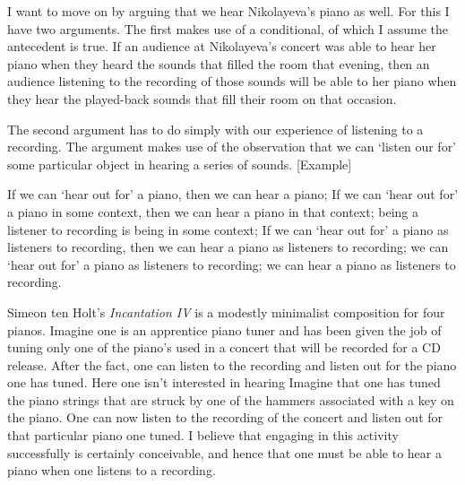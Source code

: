 \documentclass[sloppy, journal, git, bytitle, dodraft]{humapap}
\begin{document}
\sect I want to move on by arguing that we hear Nikolayeva's piano as well. For this I have two arguments. The first makes use of a conditional, of which I assume the antecedent is true. If an audience at Nikolayeva's concert was able to hear her piano when they heard the sounds that filled the room that evening, then an audience listening to the recording of those sounds will be able to her piano when they hear the played-back sounds that fill their room on that occasion. %



The second argument has to do simply with our experience of listening to a recording. The argument makes use of the observation that we can `listen our for' some particular object in hearing a series of sounds. [Example]

If we can `hear out for' a piano, then we can hear a piano; If we can `hear out for' a piano in some context, then we can hear a piano in that context; being a listener to recording is being in some context; If we can `hear out for' a piano as listeners to recording, then we can hear a piano as listeners to recording; we can `hear out for' a piano as listeners to recording; we can hear a piano as listeners to recording.


Simeon ten Holt's \emph{Incantation IV} is a modestly minimalist composition for four pianos. Imagine one is an apprentice piano tuner and has been given the job of tuning only one of the piano's used in a concert that will be recorded for a CD release. After the fact, one can listen to the recording and listen out for the piano one has tuned. Here one isn't interested in hearing  
 Imagine that one has tuned the piano strings that are struck by one of the hammers associated with a key on the piano. One can now listen to the recording of the concert and listen out for that particular piano one tuned. I believe that engaging in this activity successfully is certainly conceivable, and hence that one must be able to hear a piano when one listens to a recording. 
 
\end{document}
